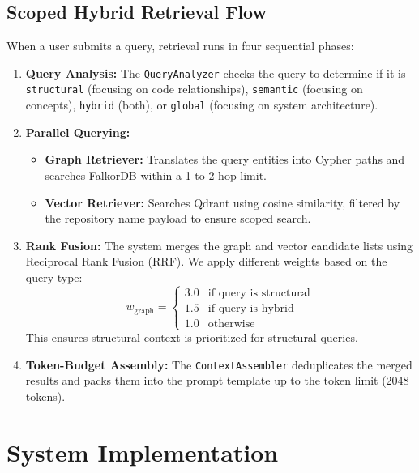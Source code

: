 \documentclass[12pt,a4paper,oneside]{report}
\begin{document}
\section{Scoped Hybrid Retrieval Flow}
When a user submits a query, retrieval runs in four sequential phases:
\begin{enumerate}
    \item \textbf{Query Analysis:} The \texttt{QueryAnalyzer} checks the query to determine if it is \texttt{structural} (focusing on code relationships), \texttt{semantic} (focusing on concepts), \texttt{hybrid} (both), or \texttt{global} (focusing on system architecture).
    \item \textbf{Parallel Querying:}
    \begin{itemize}
        \item \textbf{Graph Retriever:} Translates the query entities into Cypher paths and searches FalkorDB within a 1-to-2 hop limit.
        \item \textbf{Vector Retriever:} Searches Qdrant using cosine similarity, filtered by the repository name payload to ensure scoped search.
    \end{itemize}
    \item \textbf{Rank Fusion:} The system merges the graph and vector candidate lists using Reciprocal Rank Fusion (RRF). We apply different weights based on the query type:
    \begin{equation}
        w_{\text{graph}} = \begin{cases} 
        3.0 & \text{if query is structural} \\
        1.5 & \text{if query is hybrid} \\
        1.0 & \text{otherwise}
        \end{cases}
    \end{equation}
    This ensures structural context is prioritized for structural queries.
    \item \textbf{Token-Budget Assembly:} The \texttt{ContextAssembler} deduplicates the merged results and packs them into the prompt template up to the token limit (2048 tokens).
\end{enumerate}

\newpage

\chapter{System Implementation}
\end{document}
